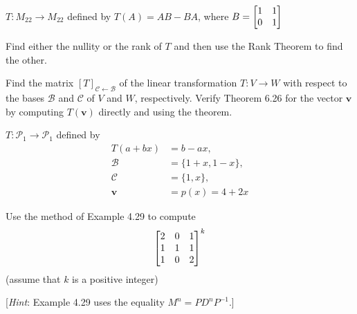 \documentclass[boxes]{gsypset}
\begin{document}
\begin{problem}[6.5.12]
	$T:M_{22}\to M_{22}$ defined by $T(A)=AB-BA$, where $B=\begin{bmatrix}1&1\\0&1\end{bmatrix}$
	
	Find either the nullity or the rank of $T$ and
	then use the Rank Theorem to find the other.
\end{problem}
\begin{solution}
	
\end{solution}

\begin{problem}[6.6.2]
	
	Find the matrix $[T]_{\mathcal{C}\leftarrow\mathcal{B}}$
	of the linear transformation $T:V\to W$ with respect to the bases 
	$\mathcal{B}$ and $\mathcal{C}$ of $V$ and $W$, respectively. 
	Verify Theorem 6.26 for the vector $\mathbf{v}$ by computing 
	$T(\mathbf{v})$ directly and using the theorem.
	
	$T: \mathscr{P}_1 \to \mathscr{P}_1$ defined by
	\begin{align*}
		T(a+bx) &= b-ax, \\
		\mathcal{B} &= \{1+x,1-x\}, \\
		\mathcal{C} &= \{1,x\}, \\
		\mathbf{v} &= p(x)=4+2x
	\end{align*}
\end{problem}
\begin{solution}
	
\end{solution}

\begin{problem}[4.4.22]
	Use the method of Example 4.29 to compute
	\[
		\begin{bmatrix}2&0&1\\1&1&1\\1&0&2\end{bmatrix}^k
	\]
	(assume that $k$ is a positive integer)
	
	[\textit{Hint}: Example 4.29 uses the equality $M^n = PD^nP^{-1}$.]
\end{problem}
\begin{solution}
	
\end{solution}
\end{document}
